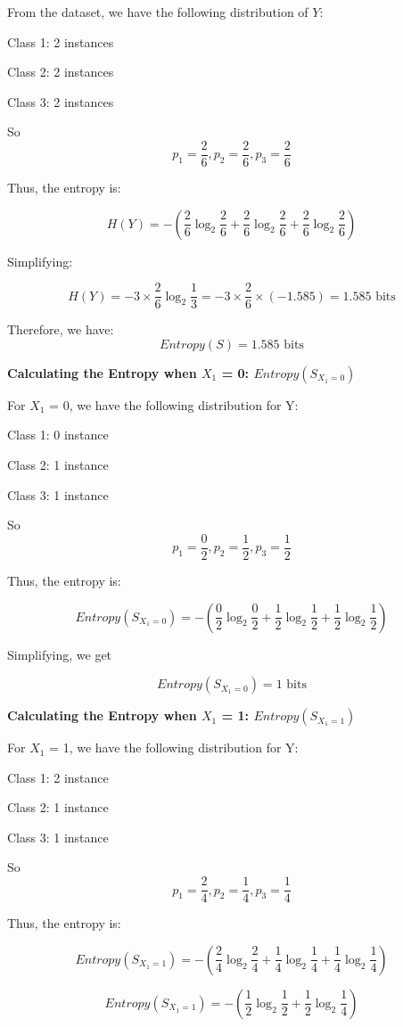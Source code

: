 \documentclass[12pt]{article}
\begin{document}
From the dataset, we have the following distribution of $Y$:

Class 1: 2 instances

Class 2: 2 instances

Class 3: 2 instances

So
\[
  p_1 = \frac{2}{6},
  p_2 = \frac{2}{6},
  p_3 = \frac{2}{6}
\]

Thus, the entropy is:

\[
  H(Y) = -\left( \frac{2}{6} \log_2 \frac{2}{6} + \frac{2}{6} \log_2 \frac{2}{6} + \frac{2}{6} \log_2 \frac{2}{6} \right)
\]

Simplifying:

\[
  H(Y) = -3 \times \frac{2}{6} \log_2 \frac{1}{3} = -3 \times \frac{2}{6} \times (-1.585) = 1.585 \text{ bits}
\]

Therefore, we have:
\[
  Entropy(S) = 1.585 \text{ bits}
\]

\textbf{Calculating the Entropy when $X_1$ = 0: $Entropy(S_{X_1=0})$}

For $X_1$ = 0, we have the following distribution for Y:

Class 1: 0 instance

Class 2: 1 instance

Class 3: 1 instance

So
\[
  p_1 = \frac{0}{2},
  p_2 = \frac{1}{2},
  p_3 = \frac{1}{2}
\]

Thus, the entropy is:

\[
  Entropy(S_{X_1=0}) = -\left( \frac{0}{2} \log_2 \frac{0}{2} + \frac{1}{2} \log_2 \frac{1}{2} + \frac{1}{2} \log_2 \frac{1}{2} \right)
\]

Simplifying, we get

\[
  Entropy(S_{X_1=0}) = 1 \text{ bits}
\]

\textbf{Calculating the Entropy when $X_1$ = 1: $Entropy(S_{X_1=1})$}

For $X_1$ = 1, we have the following distribution for Y:

Class 1: 2 instance

Class 2: 1 instance

Class 3: 1 instance

So
\[
  p_1 = \frac{2}{4},
  p_2 = \frac{1}{4},
  p_3 = \frac{1}{4}
\]

Thus, the entropy is:

\[
  Entropy(S_{X_1=1}) = -\left( \frac{2}{4} \log_2 \frac{2}{4} + \frac{1}{4} \log_2 \frac{1}{4} + \frac{1}{4} \log_2 \frac{1}{4} \right)
\]

\[
  Entropy(S_{X_1=1}) = -\left( \frac{1}{2} \log_2 \frac{1}{2} + \frac{1}{2} \log_2 \frac{1}{4} \right)
\]
\end{document}
